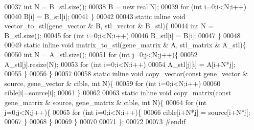 \begin{DoxyCode}
00037     \textcolor{keywordtype}{int} N = B\_stl.size();
00038     B = \textcolor{keyword}{new} real[N];
00039     \textcolor{keywordflow}{for} (\textcolor{keywordtype}{int} i=0;i<N;i++)
00040       B[i] = B\_stl[i];
00041   \}
00042 
00043   \textcolor{keyword}{static} \textcolor{keyword}{inline} \textcolor{keywordtype}{void} vector\_to\_stl(gene\_vector & B, stl\_vector & B\_stl)\{
00044     \textcolor{keywordtype}{int} N = B\_stl.size();
00045     \textcolor{keywordflow}{for} (\textcolor{keywordtype}{int} i=0;i<N;i++)
00046       B\_stl[i] = B[i];
00047   \}
00048 
00049   \textcolor{keyword}{static} \textcolor{keyword}{inline} \textcolor{keywordtype}{void} matrix\_to\_stl(gene\_matrix & A, stl\_matrix & A\_stl)\{
00050     \textcolor{keywordtype}{int} N = A\_stl.size();
00051     \textcolor{keywordflow}{for} (\textcolor{keywordtype}{int} j=0;j<N;j++)\{
00052       A\_stl[j].resize(N);
00053       \textcolor{keywordflow}{for} (\textcolor{keywordtype}{int} i=0;i<N;i++)
00054         A\_stl[j][i] = A[i+N*j];
00055     \}
00056   \}
00057 
00058   \textcolor{keyword}{static} \textcolor{keyword}{inline} \textcolor{keywordtype}{void} copy\_vector(\textcolor{keyword}{const} gene\_vector & source, gene\_vector & cible, \textcolor{keywordtype}{int} N)\{
00059     \textcolor{keywordflow}{for} (\textcolor{keywordtype}{int} i=0;i<N;i++)
00060       cible[i]=source[i];
00061   \}
00062 
00063   \textcolor{keyword}{static} \textcolor{keyword}{inline} \textcolor{keywordtype}{void} copy\_matrix(\textcolor{keyword}{const} gene\_matrix & source, gene\_matrix & cible, \textcolor{keywordtype}{int} N)\{
00064     \textcolor{keywordflow}{for} (\textcolor{keywordtype}{int} j=0;j<N;j++)\{
00065       \textcolor{keywordflow}{for} (\textcolor{keywordtype}{int} i=0;i<N;i++)\{
00066         cible[i+N*j] = source[i+N*j];
00067       \}
00068     \}
00069   \}
00070 
00071 \};
00072 
00073 \textcolor{preprocessor}{#endif}
\end{DoxyCode}
